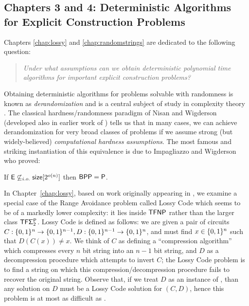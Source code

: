 \subsection{Chapters 3 and 4: Deterministic Algorithms for Explicit Construction Problems}
Chapters \ref{chap:lossy} and \ref{chap:randomstrings} are dedicated to the following question:
\begin{quote}
\textit{Under what assumptions can we obtain deterministic polynomial time algorithms for important explicit construction problems?}
\end{quote}
Obtaining deterministic algorithms for problems solvable with randomness is known as \emph{derandomization} and is a central subject of study in complexity theory . The classical hardness/randomness paradigm of Nisan and Wigderson (developed also in earlier work of \cite{Yao}) tells us that in many cases, we can achieve derandomization for very broad classes of problems if we assume strong (but widely-believed) \emph{computational hardness assumptions}. The most famous and striking instantiation of this equivalence is due to Impagliazzo and Wigderson who proved:
\begin{theorem*}[\cite{IW97}]
If $\cl{E} \not\subseteq_{i.o.} \cl{size}[2^{o(n)}]$ then $\cl{BPP} = \cl{P}$.
\end{theorem*}

In Chapter~\ref{chap:lossy}, based on work originally appearing in \cite{time-space}, we examine a special case of the Range Avoidance problem called {\sc Lossy Code} which seems to be of a markedly lower complexity: it lies inside $\cl{TFNP}$ rather than the larger class $\cl{TF\Sigma_2^P}$. {\sc Lossy Code} is defined as follows: we are given a pair of circuits $C: \{0,1\}^n \to \{0,1\}^{n-1}, D: \{0,1\}^{n-1} \to \{0,1\}^n$, and must find $x \in \{0,1\}^n$ such that $D(C(x)) \neq x$. We think of $C$ as defining a ``compression algorithm'' which compresses every $n$ bit string into an $n-1$ bit string, and $D$ as a decompression procedure which attempts to invert $C$; the {\sc Lossy Code} problem is to find a string on which this compression/decompression procedure fails to recover the original string. Observe that, if we treat $D$ as an instance of \avoid, than any \avoid solution on $D$ must be a {\sc Lossy Code} solution for $(C,D)$, hence this problem is at most as difficult as \avoid. 

